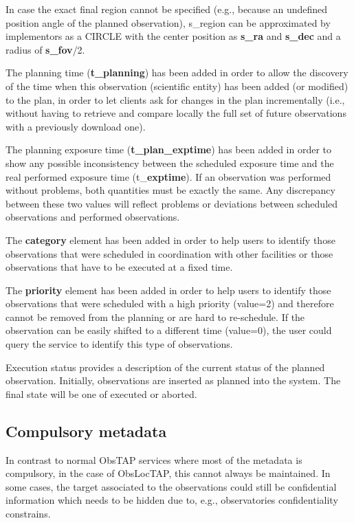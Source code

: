 \documentclass[11pt,a4paper]{ivoa}
\begin{document}
In case the exact final region cannot be specified (e.g., because an undefined
position angle of the planned observation), s\_region can be approximated by
implementors as a CIRCLE with the center position as \textbf{s\_ra} and
\textbf{s\_dec} and a radius of \textbf{s\_fov}/2.

The planning time (\textbf{t\_planning}) has been added in order to allow the
discovery of the time when this observation (scientific entity) has been added
(or modified) to the plan, in order to let clients ask for changes in the plan
incrementally (i.e., without having to retrieve and compare locally the full set
of future observations with a previously download one).

The planning exposure time (\textbf{t\_plan\_exptime}) has been added in order
to show any possible inconsistency between the scheduled exposure time and the
real performed exposure time (t\_\textbf{exptime}). If an observation was
performed without problems, both quantities must be exactly the same. Any
discrepancy between these two values will reflect problems or deviations between
scheduled observations and performed observations.

The \textbf{category} element has been added in order to help users to identify
those observations that were scheduled in coordination with other facilities or
those observations that have to be executed at a fixed time.

The \textbf{priority} element has been added in order to help users to identify
those observations that were scheduled with a high priority (value=2) and
therefore cannot be removed from the planning or are hard to re-schedule. If the
observation can be easily shifted to a different time (value=0), the user could
query the service to identify this type of observations.

Execution status provides a description of the current status of the planned
observation. Initially, observations are inserted as planned into the system.
The final state will be one of executed or aborted.

\subsection{Compulsory metadata}
In contrast to normal ObsTAP services where most of the metadata is compulsory,
in the case of ObsLocTAP, this cannot always be maintained. In some cases, the
target associated to the observations could still be confidential information
which needs to be hidden due to, e.g., observatories confidentiality constrains.
\end{document}
